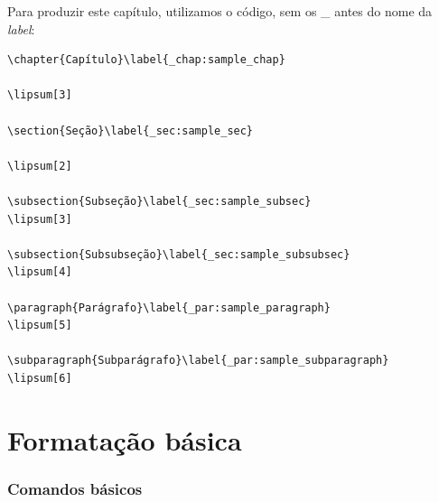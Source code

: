 \documentclass[hittite,linearb,armenian,hebraico,russian,sanskrit]{tesecaiera}
\begin{document}
\clearpage%
\noindent Para produzir este capítulo, utilizamos o código, sem os \_ antes do nome da
\emph{label}:
\begin{lstlisting}
\chapter{Capítulo}\label{_chap:sample_chap}

\lipsum[3]

\section{Seção}\label{_sec:sample_sec}

\lipsum[2]

\subsection{Subseção}\label{_sec:sample_subsec}
\lipsum[3]

\subsection{Subsubseção}\label{_sec:sample_subsubsec}
\lipsum[4]

\paragraph{Parágrafo}\label{_par:sample_paragraph}
\lipsum[5]

\subparagraph{Subparágrafo}\label{_par:sample_subparagraph}
\lipsum[6]
\end{lstlisting}

\chapter{Formatação básica}

\subsection*{Comandos básicos}
\end{document}

